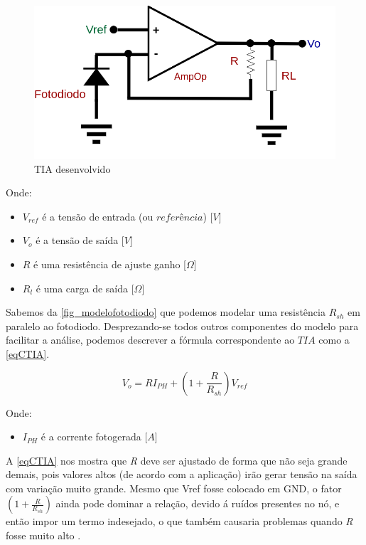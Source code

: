 \begin{figure}[htb]
	\caption{\label{fig_TIA}TIA desenvolvido}
	\begin{center}
	    \includegraphics[scale=0.3]{Circuitos/TIA.png}
	\end{center}
\end{figure}

Onde:

\begin{itemize}
    \item $V_{ref}$ \'e a tensão de entrada (ou $referência$) [$V$]
    \item $V_o$ \'e a tensão de sa\'ida [$V$]
    \item $R$ \'e uma resist\^encia de ajuste ganho [$\Omega$]
    \item $R_l$ \'e uma carga de sa\'ida [$\Omega$]
\end{itemize}

Sabemos da \autoref{fig_modelofotodiodo} que podemos modelar uma resist\^encia $R_{sh}$ em paralelo ao fotodiodo. Desprezando-se todos outros componentes do modelo para facilitar a an\'alise, podemos descrever a f\'ormula correspondente ao $TIA$ como a \autoref{eqCTIA}.

\begin{equation}
    \label{eqCTIA}
    V_o = RI_{PH} + (1+\frac{R}{R_{sh}})V_{ref}
\end{equation}

Onde:
\begin{itemize}
    \item $I_{PH}$ \'e a corrente fotogerada [$A$]
\end{itemize}

A \autoref{eqCTIA} nos mostra que \textit{R} deve ser ajustado de forma que não seja grande demais, pois valores altos (de acordo com a aplicação) irão gerar tensão na sa\'ida com variação muito grande. Mesmo que Vref fosse colocado em GND, o fator $(1+\frac{R}{R_{sh}})$ ainda pode dominar a relação, devido \'a ruídos presentes no nó, e então impor um termo indesejado, o que também causaria problemas quando \textit{R} fosse muito alto \cite{hamamatsu}.

